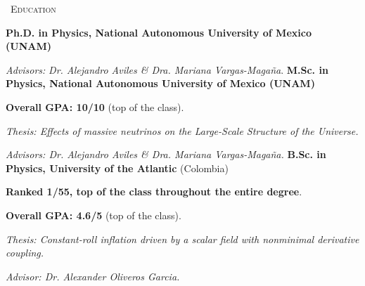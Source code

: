\begin{rubric}{\faGraduationCap\ \textsc{Education}}

\entry*[2022 --  present]%
	\textbf{Ph.D. in Physics, National Autonomous University of Mexico (UNAM)}\par
    \textit{Advisors:} \emph{Dr. Alejandro Aviles \& Dra. Mariana Vargas-Magaña}.
%
\entry*[2020 -- 2021]%
	\textbf{M.Sc. in Physics, National Autonomous University of Mexico (UNAM)}\par
    \textbf{Overall GPA: 10/10} (top of the class).\par
    \textit{Thesis: Effects of massive neutrinos on the Large-Scale Structure of the Universe.}\par
	\textit{Advisors: Dr. Alejandro Aviles \& Dra. Mariana Vargas-Magaña.}
% 
\entry*[2014 -- 2019]%
    \textbf{B.Sc. in Physics, University of the Atlantic} (Colombia)\par
    \textbf{Ranked 1/55, top of the class throughout the entire degree}.\par
    \textbf{Overall GPA: 4.6/5} (top of the class).\par
    \textit{Thesis: Constant-roll inflation driven by a scalar field with nonminimal derivative coupling.}\par
	\textit{Advisor: Dr. Alexander Oliveros Garcia.}
\end{rubric}